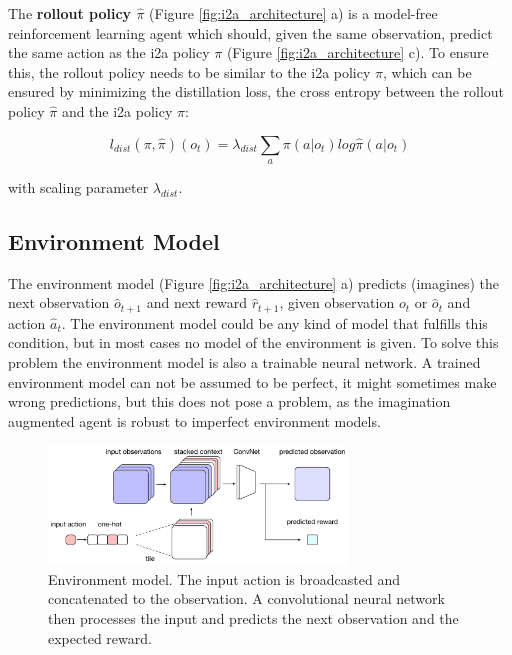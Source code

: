 The \textbf{rollout policy $\hat{\pi}$} (Figure \ref{fig:i2a_architecture} a) is a model-free reinforcement learning agent which should, given the same observation, predict the same action as the i2a policy $\pi$ (Figure \ref{fig:i2a_architecture} c). To ensure this, the rollout policy needs to be similar to the i2a policy $\pi$, which can be ensured by minimizing the distillation loss, the cross entropy between the rollout policy $\hat{\pi}$ and the i2a policy $\pi$:
 
\begin{equation} 
    l_{dist}(\pi, \hat{\pi})(o_t) = \lambda_{dist} \sum_a \pi(a | o_t) log \hat{\pi}(a|o_t) 
\end{equation} 

with scaling parameter $\lambda_{dist}$.\\


\subsection{Environment Model}
\label{sec:env_model}

The environment model (Figure \ref{fig:i2a_architecture} a) predicts (imagines) the next observation $\hat{o}_{t+1}$ and next reward $\hat{r}_{t+1}$, given observation $o_t$ or $\hat{o}_t$ and action $\hat{a}_t$.
The environment model could be any kind of model that fulfills this condition, but in most cases no model of the environment is given.
To solve this problem the environment model is also a trainable neural network.
A trained environment model can not be assumed to be perfect, it might sometimes make wrong predictions, but this does not pose a problem, as the imagination augmented agent is robust to imperfect environment models.

   
\begin{figure}[H] 
  \centering    
  \includegraphics[width=300px]{./Images/i2a_env.pdf}
  \caption{Environment model. The input action is broadcasted and concatenated to the observation. A convolutional neural network then processes the input and predicts the next observation and the expected reward.} 
  \label{fig:environment_model_architecture} 
\end{figure} 

